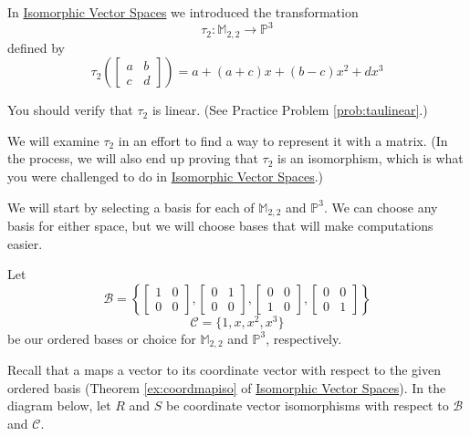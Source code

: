 \documentclass{ximera}
\begin{document}
\begin{exploration}\label{init:taumatrix}
In \href{https://ximera.osu.edu/oerlinalg/LinearAlgebra/LTR-0060/main}{Isomorphic Vector Spaces} we introduced the transformation
$$\tau_2:\mathbb{M}_{2,2}\rightarrow\mathbb{P}^3$$
defined by
$$\tau_2\left(\begin{bmatrix}a&b\\c&d\end{bmatrix}\right)=a+(a+c)x+(b-c)x^2+dx^3$$

You should verify that $\tau_2$ is linear.  (See Practice Problem \ref{prob:taulinear}.)

We will examine $\tau_2$ in an effort to find a way to represent it with a matrix.  (In the process, we will also end up proving that $\tau_2$ is an isomorphism, which is what you were challenged to do in \href{https://ximera.osu.edu/oerlinalg/LinearAlgebra/LTR-0060/main}{Isomorphic Vector Spaces}.)

We will start by selecting a basis for each of $\mathbb{M}_{2,2}$ and $\mathbb{P}^3$.  We can choose any basis for either space, but we will choose bases that will make computations easier.

Let 
$$\mathcal{B}=\left\{\begin{bmatrix}1&0\\0&0\end{bmatrix}, \begin{bmatrix}0&1\\0&0\end{bmatrix}, \begin{bmatrix}0&0\\1&0\end{bmatrix}, \begin{bmatrix}0&0\\0&1\end{bmatrix}\right\}$$
$$\mathcal{C}=\{1, x, x^2, x^3\}$$
be our ordered bases or choice for $\mathbb{M}_{2,2}$ and $\mathbb{P}^3$, respectively.

Recall that a  maps a vector to its coordinate vector with respect to the given ordered basis (Theorem \ref{ex:coordmapiso} of \href{https://ximera.osu.edu/oerlinalg/LinearAlgebra/LTR-0060/main}{Isomorphic Vector Spaces}).  In the diagram below, let $R$ and $S$ be coordinate vector isomorphisms with respect to $\mathcal{B}$ and $\mathcal{C}$.

\begin{center}
\end{center}
\end{exploration}
\end{document}
